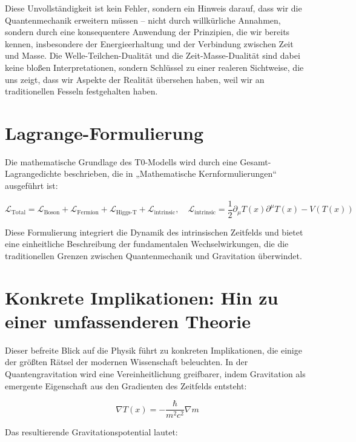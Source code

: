 \documentclass[a4paper,12pt]{article}
\newcommand{\Tfield}{T(x)}
\begin{document}
	Diese Unvollständigkeit ist kein Fehler, sondern ein Hinweis darauf, dass wir die Quantenmechanik erweitern müssen – nicht durch willkürliche Annahmen, sondern durch eine konsequentere Anwendung der Prinzipien, die wir bereits kennen, insbesondere der Energieerhaltung und der Verbindung zwischen Zeit und Masse. Die Welle-Teilchen-Dualität und die Zeit-Masse-Dualität sind dabei keine bloßen Interpretationen, sondern Schlüssel zu einer realeren Sichtweise, die uns zeigt, dass wir Aspekte der Realität übersehen haben, weil wir an traditionellen Fesseln festgehalten haben.
	
	\section{Lagrange-Formulierung}
	
	Die mathematische Grundlage des T0-Modells wird durch eine Gesamt-Lagrangedichte beschrieben, die in „Mathematische Kernformulierungen“ \cite{pascher_lagrange_2025} ausgeführt ist:
	
	\begin{equation}
		\mathcal{L}_{\text{Total}} = \mathcal{L}_{\text{Boson}} + \mathcal{L}_{\text{Fermion}} + \mathcal{L}_{\text{Higgs-T}} + \mathcal{L}_{\text{intrinsic}}, \quad \mathcal{L}_{\text{intrinsic}} = \frac{1}{2} \partial_\mu \Tfield \partial^\mu \Tfield - V(\Tfield)
	\end{equation}
	
	Diese Formulierung integriert die Dynamik des intrinsischen Zeitfelds und bietet eine einheitliche Beschreibung der fundamentalen Wechselwirkungen, die die traditionellen Grenzen zwischen Quantenmechanik und Gravitation überwindet.
	
	\section{Konkrete Implikationen: Hin zu einer umfassenderen Theorie}
	
	Dieser befreite Blick auf die Physik führt zu konkreten Implikationen, die einige der größten Rätsel der modernen Wissenschaft beleuchten. In der Quantengravitation wird eine Vereinheitlichung greifbarer, indem Gravitation als emergente Eigenschaft aus den Gradienten des Zeitfelds entsteht:
	
	\begin{equation}
		\nabla \Tfield = -\frac{\hbar}{m^2 c^2} \nabla m
	\end{equation}
	
	Das resultierende Gravitationspotential lautet:
	
\end{document}
